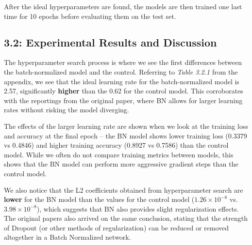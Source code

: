 \documentclass{article}
\begin{document}
\begin{multicols*}{2}
After the ideal hyperparameters are found, the models are then trained 
one last time for 10 epochs before evaluating them on the test set. 

\subsection*{3.2: Experimental Results and Discussion}

The hyperparameter search process is where we see the first differences
between the batch-normalized model and the control. Referring to \textit{Table 3.2.1} 
from the appendix, we see that the ideal learning rate for the batch-normalized 
model is 2.57, significantly \textbf{higher} than the 0.62 for the control model. This 
corroborates with the reportings from the original paper, where BN allows for 
larger learning rates without risking the model diverging. 

The effects of the larger learning rate are shown when we look at the training
loss and accuracy at the final epoch -- the BN model shows lower training
loss (0.3379 vs 0.4846) and higher training accuracy (0.8927 vs 0.7586) than 
the control model. While we often do not compare training metrics between models,
this shows that the BN model can perform more aggressive gradient steps than 
the control model.

We also notice that the L2 coefficients obtained from hyperparameter 
search are \textbf{lower} for the BN model than the values for the control model 
($1.26 \times 10^{-8}$ vs. $3.98 \times 10^{-8}$), which suggests that BN also 
provides slight regularization effects. The original papers\cite{batchnorm}
also arrived on the same conclusion, stating that the strength of Dropout\cite{dropout} (or 
other methods of regularization) can be reduced or removed altogether in a Batch Normalized 
network.



\end{multicols*}
\end{document}
